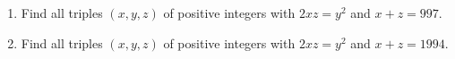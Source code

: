 \begin{enumerate}
\item[(a)] Find all triples $(x,y,z)$ of positive integers with $2xz=y^2$ and $x+z=997$.
\item[(b)] Find all triples $(x,y,z)$ of positive integers with $2xz=y^2$ and $x+z=1994$.
\end{enumerate}
